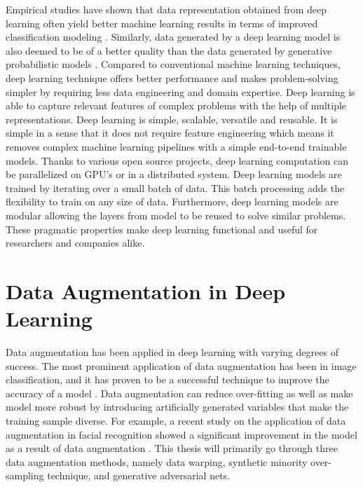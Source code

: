 Empirical studies have shown that data representation obtained from deep learning often yield better machine learning results in terms of improved classification modeling \citep{larochelle2009exploring}. Similarly, data generated by a deep learning model is also deemed to be of a better quality than the data generated by generative probabilistic models \citep{najafabadi2015deep}. Compared to conventional machine learning techniques, deep learning technique offers better performance and makes problem-solving simpler by requiring less data engineering and domain expertise. Deep learning is able to capture relevant features of complex problems with the help of multiple representations. Deep learning is simple, scalable, versatile and reusable. It is simple in a sense that it does not require feature engineering which means it removes complex machine learning pipelines with a simple end-to-end trainable models. Thanks to various open source projects, deep learning computation can be parallelized on GPU's or in a distributed system. Deep learning models are trained by iterating over a small batch of data. This batch processing adds the flexibility to train on any size of data. Furthermore, deep learning models are modular allowing the layers from model to be reused to solve similar problems. These pragmatic properties make deep learning functional and useful for researchers and companies alike.    

\section{Data Augmentation in Deep Learning}
Data augmentation has been applied in deep learning with varying degrees of success. The most prominent application of data augmentation has been in image classification, and it has proven to be a successful technique to improve the accuracy of a model \citep{krizhevsky2012imagenet}. Data augmentation can reduce over-fitting as well as make model more robust by introducing artificially generated variables that make the training sample diverse. For example, a recent study on the application of data augmentation in facial recognition showed a significant improvement in the model as a result of data augmentation \citep{kortylewski2018training}. This thesis will primarily go through three data augmentation methods, namely data warping, synthetic minority over-sampling technique, and generative adversarial nets. 

